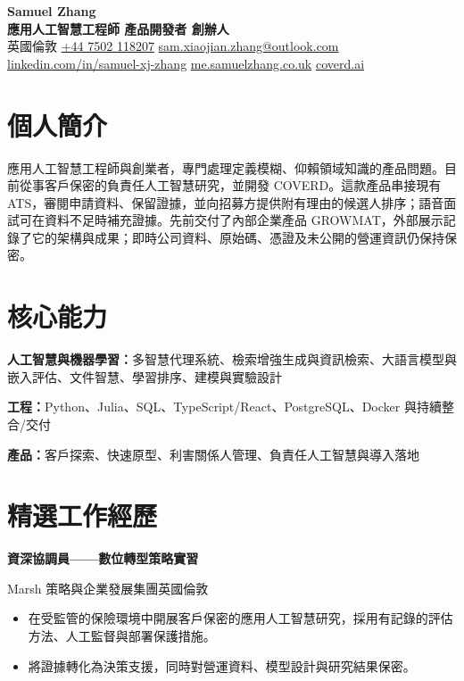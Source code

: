 \documentclass[UTF8,11pt,a4paper,fontset=none]{ctexart}
\newcommand{\cvdate}[1]{{\normalfont\normalsize\bfseries #1}}
\newcommand{\primaryrole}[4]{%
  \textbf{#1}\par\vspace{-1pt}
  {\small\color{muted}#2\enspace\textbullet\enspace #4\hfill\color{ink}\cvdate{#3}\par}\vspace{-1pt}
}
\begin{document}
\begin{center}
  {\huge\bfseries Samuel Zhang}\\[2pt]
  {\large\bfseries 應用人工智慧工程師 \textperiodcentered{} 產品開發者 \textperiodcentered{} 創辦人}\\[4pt]
  \small
  英國倫敦 \enspace\textbullet\enspace
  \href{tel:+447502118207}{+44 7502 118207} \enspace\textbullet\enspace
  \href{mailto:sam.xiaojian.zhang@outlook.com}{sam.xiaojian.zhang@outlook.com}\\[-1pt]
  \href{https://www.linkedin.com/in/samuel-xj-zhang/}{linkedin.com/in/samuel-xj-zhang}
  \enspace\textbullet\enspace
  \href{https://me.samuelzhang.co.uk}{me.samuelzhang.co.uk}
  \enspace\textbullet\enspace
  \href{https://coverd.ai}{coverd.ai}
\end{center}

\section{個人簡介}
應用人工智慧工程師與創業者，專門處理定義模糊、仰賴領域知識的產品問題。目前從事客戶保密的負責任人工智慧研究，並開發 COVERD。這款產品串接現有 ATS，審閱申請資料、保留證據，並向招募方提供附有理由的候選人排序；語音面試可在資料不足時補充證據。先前交付了內部企業產品 GROWMAT，外部展示記錄了它的架構與成果；即時公司資料、原始碼、憑證及未公開的營運資訊仍保持保密。

\section{核心能力}
\textbf{人工智慧與機器學習：}多智慧代理系統、檢索增強生成與資訊檢索、大語言模型與嵌入評估、文件智慧、學習排序、建模與實驗設計

\textbf{工程：}Python、Julia、SQL、TypeScript/React、PostgreSQL、Docker 與持續整合/交付

\textbf{產品：}客戶探索、快速原型、利害關係人管理、負責任人工智慧與導入落地

\section{精選工作經歷}

\primaryrole{資深協調員——數位轉型策略實習}{Marsh \textperiodcentered{} 策略與企業發展集團}{2026 年 5 月—至今}{英國倫敦}
\begin{itemize}
  \item 在受監管的保險環境中開展客戶保密的應用人工智慧研究，採用有記錄的評估方法、人工監督與部署保護措施。
  \item 將證據轉化為決策支援，同時對營運資料、模型設計與研究結果保密。
\end{itemize}
\end{document}

